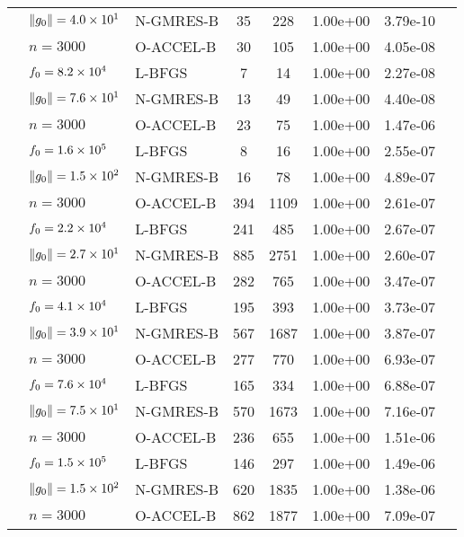 \begin{tabular}{*{3}{l}*{2}{S[table-format=4]}
*{2}{S[table-format=-1.1e-2]}c}
 & ${\|g_0\|} = \num{4.0e+01} $  & N-GMRES-B & 35 & 228 & 1.00e+00 & 3.79e-10 &  \\
\addlinespace
{} & $ n = \num{3000} $  & O-ACCEL-B & 30 & 105 & 1.00e+00 & 4.05e-08 &  \\
 & $f_0 = \num{8.2e+04} $  & L-BFGS & 7 & 14 & 1.00e+00 & 2.27e-08 &  \\
 & ${\|g_0\|} = \num{7.6e+01} $  & N-GMRES-B & 13 & 49 & 1.00e+00 & 4.40e-08 &  \\
\addlinespace
{} & $ n = \num{3000} $  & O-ACCEL-B & 23 & 75 & 1.00e+00 & 1.47e-06 &  \\
 & $f_0 = \num{1.6e+05} $  & L-BFGS & 8 & 16 & 1.00e+00 & 2.55e-07 &  \\
 & ${\|g_0\|} = \num{1.5e+02} $  & N-GMRES-B & 16 & 78 & 1.00e+00 & 4.89e-07 &  \\
\addlinespace
{} & $ n = \num{3000} $  & O-ACCEL-B & 394 & 1109 & 1.00e+00 & 2.61e-07 &  \\
 & $f_0 = \num{2.2e+04} $  & L-BFGS & 241 & 485 & 1.00e+00 & 2.67e-07 &  \\
 & ${\|g_0\|} = \num{2.7e+01} $  & N-GMRES-B & 885 & 2751 & 1.00e+00 & 2.60e-07 &  \\
\addlinespace
{} & $ n = \num{3000} $  & O-ACCEL-B & 282 & 765 & 1.00e+00 & 3.47e-07 &  \\
 & $f_0 = \num{4.1e+04} $  & L-BFGS & 195 & 393 & 1.00e+00 & 3.73e-07 &  \\
 & ${\|g_0\|} = \num{3.9e+01} $  & N-GMRES-B & 567 & 1687 & 1.00e+00 & 3.87e-07 &  \\
\addlinespace
{} & $ n = \num{3000} $  & O-ACCEL-B & 277 & 770 & 1.00e+00 & 6.93e-07 &  \\
 & $f_0 = \num{7.6e+04} $  & L-BFGS & 165 & 334 & 1.00e+00 & 6.88e-07 &  \\
 & ${\|g_0\|} = \num{7.5e+01} $  & N-GMRES-B & 570 & 1673 & 1.00e+00 & 7.16e-07 &  \\
\addlinespace
{} & $ n = \num{3000} $  & O-ACCEL-B & 236 & 655 & 1.00e+00 & 1.51e-06 &  \\
 & $f_0 = \num{1.5e+05} $  & L-BFGS & 146 & 297 & 1.00e+00 & 1.49e-06 &  \\
 & ${\|g_0\|} = \num{1.5e+02} $  & N-GMRES-B & 620 & 1835 & 1.00e+00 & 1.38e-06 &  \\
\addlinespace
{} & $ n = \num{3000} $  & O-ACCEL-B & 862 & 1877 & 1.00e+00 & 7.09e-07 &  \\

\end{tabular}
